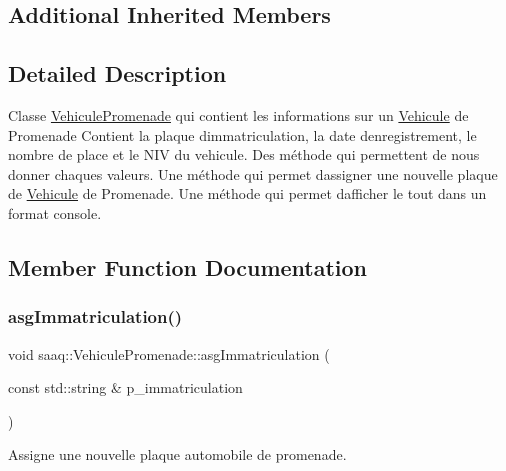 \subsection*{Additional Inherited Members}


\subsection{Detailed Description}
Classe \hyperlink{classsaaq_1_1VehiculePromenade}{Vehicule\+Promenade} qui contient les informations sur un \hyperlink{classsaaq_1_1Vehicule}{Vehicule} de Promenade Contient la plaque d\textquotesingle{}immatriculation, la date d\textquotesingle{}enregistrement, le nombre de place et le N\+IV du vehicule. Des méthode qui permettent de nous donner chaques valeurs. Une méthode qui permet d\textquotesingle{}assigner une nouvelle plaque de \hyperlink{classsaaq_1_1Vehicule}{Vehicule} de Promenade. Une méthode qui permet d\textquotesingle{}afficher le tout dans un format console. 

\subsection{Member Function Documentation}
\mbox{\label{classsaaq_1_1VehiculePromenade_a86cbcf72ff776c5e79dcfd9703d7121e}} 
\subsubsection{\texorpdfstring{asg\+Immatriculation()}{asgImmatriculation()}}
{\footnotesize\ttfamily void saaq\+::\+Vehicule\+Promenade\+::asg\+Immatriculation (\begin{DoxyParamCaption}\item[{const std\+::string \&}]{p\+\_\+immatriculation }\end{DoxyParamCaption})}



Assigne une nouvelle plaque automobile de promenade. 


